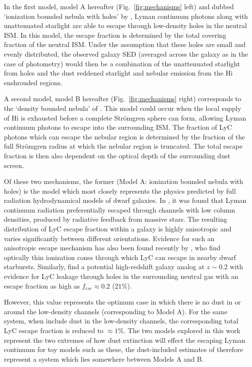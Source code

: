 In the first model, model A hereafter (Fig.~\ref{fig:mechanisms} left) and dubbed `ionization bounded nebula with holes' by \citeauthor{Zackrisson:2013iz}, Lyman continuum photons along with unattenuated starlight are able to escape through low-density holes in the neutral ISM. In this model, the escape fraction is determined by the total covering fraction of the neutral ISM. Under the assumption that these holes are small and evenly distributed, the observed galaxy SED (averaged across the galaxy as in the case of photometry) would then be a combination of the unattenuated starlight from holes and the dust reddened starlight and nebular emission from the H{\sc i} enshrouded regions.

A second model, model B hereafter (Fig.~\ref{fig:mechanisms} right) corresponds to the `density bounded nebula' of \citet{Zackrisson:2013iz}. This model could occur when the local supply of H{\sc i} is exhausted before a complete Str{\"o}mgren sphere can form, allowing Lyman continuum photons to escape into the surrounding ISM. The fraction of LyC photons which can escape the nebular region is determined by the fraction of the full Str{\"o}mgren radius at which the nebular region is truncated. The total escape fraction is then also dependent on the optical depth of the surrounding dust screen.

Of these two mechanisms, the former (Model A: ionization bounded nebula with holes) is the model which most closely represents the physics predicted by full radiation hydrodynamical models of dwarf galaxies. In \citet{Wise:2009fn}, it was found that Lyman continuum radiation preferentially escaped through channels with low column densities, produced by radiative feedback from massive stars. The resulting distribution of LyC escape fraction within a galaxy is highly anisotropic and varies significantly between different orientations. Evidence for such an anisotropic escape mechanism has also been found recently by \citet{Zastrow:2013bg}, who find optically thin ionization cones through which LyC can escape in nearby dwarf starbursts. Similarly, \citet{Borthakur:2014bz} find a potential high-redshift galaxy analog at $z\sim0.2$ with evidence for LyC leakage through holes in the surrounding neutral gas with an escape fraction as high as $f_{esc} \approx 0.2$ (21\%). 

However, this value represents the optimum case in which there is no dust in or around the low-density channels (corresponding to Model A). For the same system, when \citet{Borthakur:2014bz} include dust in the low-density channels, the corresponding total LyC escape fraction is reduced to $\approx 1\%$. The two models explored in this work represent the two extremes of how dust extinction will effect the escaping Lyman continuum for toy models such as these, the dust-included estimates of \citet{Borthakur:2014bz} therefore represent a system which lies somewhere between Models A and B. 

